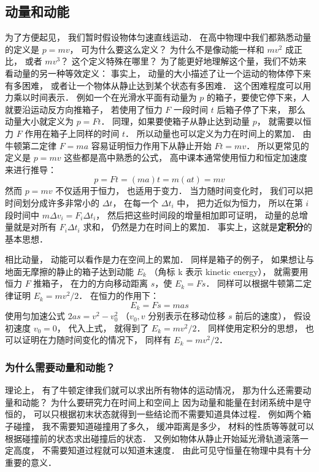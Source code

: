 

\subsection{动量和动能}
为了方便起见， 我们暂时假设物体匀速直线运动． 在高中物理中我们都熟悉动量的定义是 $p = mv$， 可为什么要这么定义？ 为什么不是像动能一样和 $mv^2$ 成正比， 或者 $mv^3$？ 这个定义特殊在哪里？ 为了能更好地理解这个量，我们不妨来看动量的另一种等效定义： 事实上， 动量的大小描述了让一个运动的物体停下来有多困难， 或者让一个物体从静止达到某个状态有多困难． 这个困难程度可以用力乘以时间表示． 例如一个在光滑水平面有动量为 $p$ 的箱子，要使它停下来，人就要沿运动反方向推箱子， 若使用了恒力 $F$ 一段时间 $t$ 后箱子停了下来， 那么动量大小就定义为 $p = Ft$．%
同理，如果要使箱子从静止达到动量 $p$， 就需要以恒力 $F$ 作用在箱子上同样的时间 $t$． 所以动量也可以定义为力在时间上的累加． 由牛顿第二定律 $F = ma$ 容易证明恒力作用下从静止开始 $Ft = mv$． 所以更常见的定义是 $p = mv$ 这些都是高中熟悉的公式， 高中课本通常使用恒力和恒定加速度来进行推导：
\begin{equation}
p = Ft = (ma)t = m(at) = mv
\end{equation}
然而 $p = mv$ 不仅适用于恒力， 也适用于变力． 当力随时间变化时， 我们可以把时间划分成许多非常小的 $\Delta t$， 在每一个 $\Delta t_i$ 中， 把力近似为恒力， 所以在第 $i$ 段时间中 $m\Delta v_i = F_i\Delta t_i$， 然后把这些时间段的增量相加即可证明， 动量的总增量就是对所有 $F_i\Delta t_i$ 求和， 仍然是力在时间上的累加． 事实上，这就是\textbf{定积分}的基本思想．

相比动量， 动能可以看作是力在空间上的累加． 同样是箱子的例子， 如果想让与地面无摩擦的静止的箱子达到动能 $E_k$ （角标 k 表示 kinetic energy）， 就需要用恒力 $F$ 推箱子， 在力的方向移动距离 $s$，使 $E_k = Fs$． 同样可以根据牛顿第二定律证明 $E_k = mv^2/2$． 在恒力的作用下：
\begin{equation}
E_k = Fs = mas
\end{equation}
使用匀加速公式 $2as = v^2 - v_0^2$ （$v_0, v$ 分别表示在移动位移 $s$ 前后的速度）， 假设初速度 $v_0 = 0$， 代入上式， 就得到了 $E_k = mv^2/2$． 同样使用定积分的思想， 也可以证明在力随时间变化的情况下， 同样有 $E_k = mv^2/2$．

\subsubsection{为什么需要动量和动能？}
理论上， 有了牛顿定律我们就可以求出所有物体的运动情况， 那为什么还需要动量和动能？ 为什么要研究力在时间上和空间上 因为动量和能量在封闭系统中是守恒的， 可以只根据初末状态就得到一些结论而不需要知道具体过程． 例如两个箱子碰撞， 我不需要知道碰撞用了多久， 缓冲距离是多少， 材料的性质等等就可以根据碰撞前的状态求出碰撞后的状态． 又例如物体从静止开始延光滑轨道滚落一定高度， 不需要知道过程就可以知道末速度． 由此可见守恒量在物理中具有十分重要的意义．

